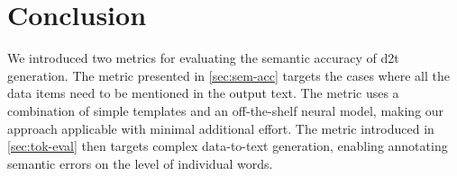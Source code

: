 \section{Conclusion}
We introduced two metrics for evaluating the semantic accuracy of \ac{d2t} generation. The metric presented in \autoref{sec:sem-acc} targets the cases where all the data items need to be mentioned in the output text. The metric uses a combination of simple templates and an off-the-shelf neural model, making our approach applicable with minimal additional effort. The metric introduced in \autoref{sec:tok-eval} then targets complex data-to-text generation, enabling annotating semantic errors on the level of individual words.